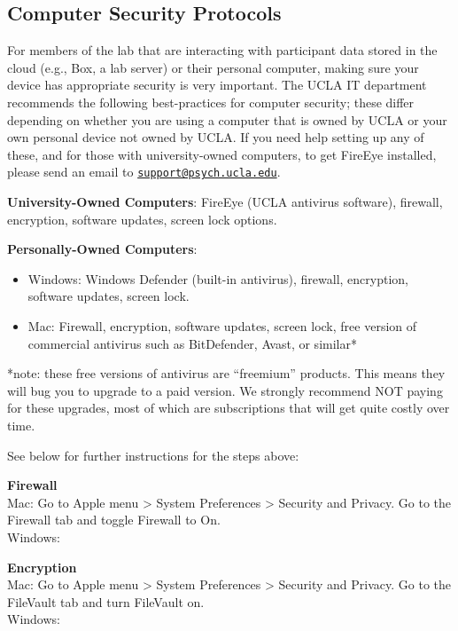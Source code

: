 \documentclass[
]{book}
\providecommand{\tightlist}{%
  \setlength{\itemsep}{0pt}\setlength{\parskip}{0pt}}
\begin{document}
\hypertarget{computer-security-protocols}{%
\subsection{Computer Security Protocols}\label{computer-security-protocols}}

For members of the lab that are interacting with participant data stored in the cloud (e.g., Box, a lab server) or their personal computer, making sure your device has appropriate security is very important. The UCLA IT department recommends the following best-practices for computer security; these differ depending on whether you are using a computer that is owned by UCLA or your own personal device not owned by UCLA. If you need help setting up any of these, and for those with university-owned computers, to get FireEye installed, please send an email to \href{mailto:support@psych.ucla.edu}{\nolinkurl{support@psych.ucla.edu}}.

\textbf{University-Owned Computers}: FireEye (UCLA antivirus software), firewall, encryption, software updates, screen lock options.

\textbf{Personally-Owned Computers}:

\begin{itemize}
\tightlist
\item
  Windows: Windows Defender (built-in antivirus), firewall, encryption, software updates, screen lock.
\item
  Mac: Firewall, encryption, software updates, screen lock, free version of commercial antivirus such as BitDefender, Avast, or similar*
\end{itemize}

*note: these free versions of antivirus are ``freemium'' products. This means they will bug you to upgrade to a paid version. We strongly recommend NOT paying for these upgrades, most of which are subscriptions that will get quite costly over time.

See below for further instructions for the steps above:

\textbf{Firewall}\\
Mac: Go to Apple menu \textgreater{} System Preferences \textgreater{} Security and Privacy. Go to the Firewall tab and toggle Firewall to On.\\
Windows:

\textbf{Encryption}\\
Mac: Go to Apple menu \textgreater{} System Preferences \textgreater{} Security and Privacy. Go to the FileVault tab and turn FileVault on.\\
Windows:
\end{document}
